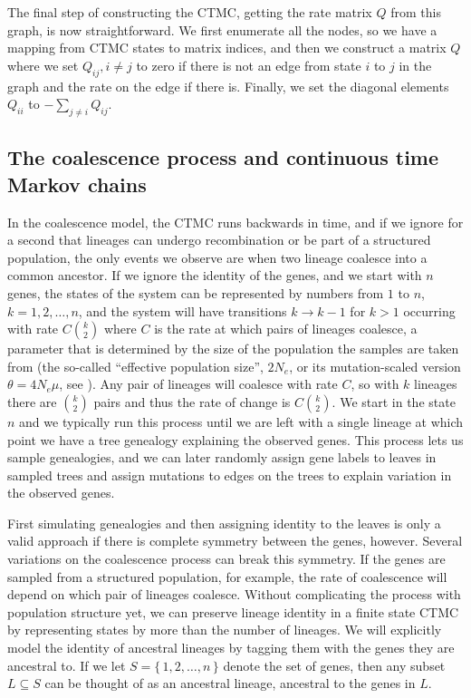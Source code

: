 \documentclass[graybox]{svmult}
\begin{document}
The final step of constructing the CTMC, getting the rate matrix $Q$ from this graph, is now straightforward. We first enumerate all the nodes, so we have a mapping from CTMC states to matrix indices, and then we construct a matrix $Q$ where we set $Q_{ij}, i\neq j$ to zero if there is not an edge from state $i$ to $j$ in the graph and the rate on the edge if there is. Finally, we set the diagonal elements $Q_{ii}$ to $-\sum_{j \neq i} Q_{ij}$.



\subsection{The coalescence process and continuous time Markov chains}

In the coalescence model, the CTMC runs backwards in time, and if we ignore for a second that lineages can undergo recombination or be part of a structured population, the only events we observe are when two lineage coalesce into a common ancestor. If we ignore the identity of the genes, and we start with $n$ genes, the states of the system can be represented by numbers from $1$ to $n$, $k=1,2,\ldots,n$, and the system will have transitions $k\to k-1$ for $k>1$ occurring with rate $C{k \choose 2}$ where $C$ is the rate at which pairs of lineages coalesce, a parameter that is determined by the size of the population the samples are taken from (the so-called ``effective population size'', $2N_e$, or its mutation-scaled version $\theta=4 N_e \mu$, see \citet{Hein:2004ta}). Any pair of lineages will coalesce with rate $C$, so with $k$ lineages there are $k \choose 2$ pairs and thus the rate of change is $C{k \choose 2}$. We start in the state $n$ and we typically run this process until we are left with a single lineage at which point we have a tree genealogy explaining the observed genes. This process lets us sample genealogies, and we can later randomly assign gene labels to leaves in sampled trees and assign mutations to edges on the trees to explain variation in the observed genes.


First simulating genealogies and then assigning identity to the leaves is only a valid approach if there is complete symmetry between the genes, however. Several variations on the coalescence process can break this symmetry. If the genes are sampled from a structured population, for example, the rate of coalescence will depend on which pair of lineages coalesce. Without complicating the process with population structure yet, we can preserve lineage identity in a finite state CTMC by representing states by more than the number of lineages. We will explicitly model the identity of ancestral lineages by tagging them with the genes they are ancestral to. If we let $S=\{\,1,2,\ldots,n\,\}$ denote the set of genes, then any subset $L\subseteq S$ can be thought of as an ancestral lineage, ancestral to the genes in $L$.
\end{document}
